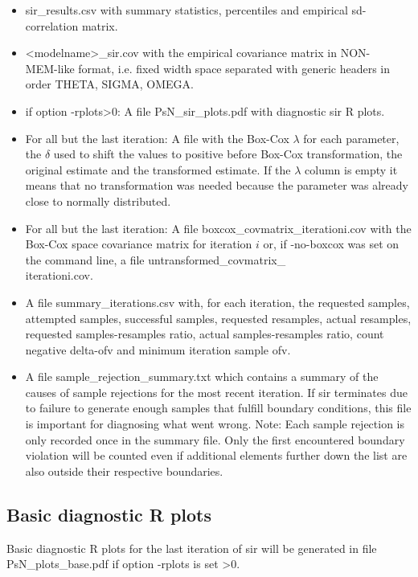 \begin{itemize}
\item sir\_results.csv with summary statistics, percentiles and empirical sd-correlation matrix. 
\item <modelname>\_sir.cov with the empirical covariance matrix in NON-\\MEM-like format, i.e. fixed width space separated with generic headers in order THETA, SIGMA, OMEGA.
\item if option -rplots>0: A file PsN\_sir\_plots.pdf with diagnostic sir R plots.
\item For all but the last iteration: A file with the Box-Cox $\lambda$ for each parameter, the $\delta$ used to shift
the values to positive before Box-Cox transformation, the original estimate and the transformed estimate. If the $\lambda$ column is empty it means that no transformation was needed because the parameter was already close to normally distributed.
\item For all but the last iteration: A file boxcox\_covmatrix\_iterationi.cov with the Box-Cox space covariance matrix for iteration $i$ or, if -no-boxcox was set on the command line, a file untransformed\_covmatrix\_\\iterationi.cov.
\item A file summary\_iterations.csv with, for each iteration, the requested samples, attempted samples, successful samples, requested resamples, actual resamples, requested samples-resamples ratio, actual samples-resamples ratio, count negative delta-ofv and minimum iteration sample ofv.
\item A file sample\_rejection\_summary.txt which contains a summary of the causes of sample rejections for the most recent iteration. If sir terminates due to failure to generate enough samples that fulfill boundary conditions, this file
is important for diagnosing what went wrong. Note: Each sample rejection is only recorded once in the summary file.
Only the first encountered boundary violation will be counted even if additional elements further down the list are also outside their respective boundaries.
\end{itemize}

\subsection{Basic diagnostic R plots}
Basic diagnostic R plots for the last iteration of sir will be generated in file  PsN\_plots\_base.pdf if option -rplots is set >0.

